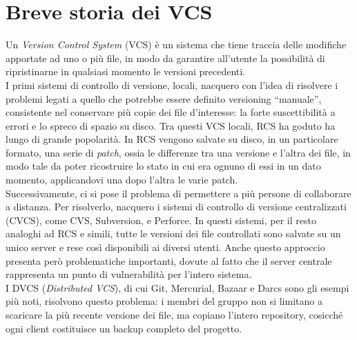 \documentclass[12pt]{article}
\def\quote#1{``#1''}
\begin{document}
\section{Breve storia dei VCS}
Un \textit{Version Control System} (VCS) è un sistema che tiene traccia delle modifiche apportate ad uno o più file, in modo da garantire all'utente la possibilità di ripristinarne in qualsiasi momento le versioni precedenti. 
\bigskip \\
I primi sistemi di controllo di versione, locali, nacquero con l'idea di risolvere i problemi legati a quello che potrebbe essere definito versioning \quote{manuale}, consistente nel conservare più copie dei file d'interesse: la forte suscettibilità a errori e lo spreco di spazio su disco. Tra questi VCS locali, RCS ha goduto ha lungo di grande popolarità. In RCS vengono salvate su disco, in un particolare formato, una serie di \textit{patch}, ossia le differenze tra una versione e l'altra dei file, in modo tale da poter ricostruire lo stato in cui era ognuno di essi in un dato momento, applicandovi una dopo l'altra le varie patch.
\bigskip \\
Successivamente, ci si pose il problema di permettere a più persone di collaborare a distanza. Per risolverlo, nacquero i sistemi di controllo di versione centralizzati (CVCS), come CVS, Subversion, e Perforce. In questi sistemi, per il resto analoghi ad RCS e simili, tutte le versioni dei file controllati sono salvate su un unico server e rese così disponibili ai diversi utenti. Anche questo approccio presenta però problematiche importanti, dovute al fatto che il server centrale rappresenta un punto di vulnerabilità per l'intero sistema. 
\bigskip \\
I DVCS (\textit{Distributed VCS}), di cui Git, Mercurial, Bazaar e Darcs sono gli esempi più noti, risolvono questo problema: i membri del gruppo non si limitano a scaricare la più recente versione dei file, ma copiano l'intero repository, cosicché ogni client costituisce un backup completo del progetto.
\end{document}
